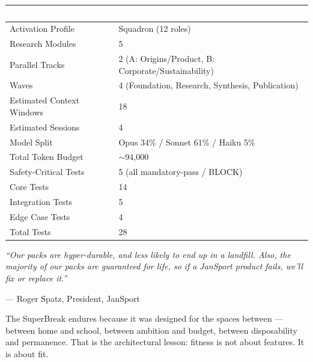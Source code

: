 \documentclass[11pt,letterpaper]{article}
\newcommand{\tableheader}[1]{\textbf{\sffamily\textcolor{white}{#1}}}
\begin{document}
\begin{center}
\begin{tabularx}{\textwidth}{L{5cm}X}
\toprule
{}
\tableheader{Metric} & \tableheader{Value} \\
\midrule
Activation Profile & Squadron (12 roles) \\
Research Modules & 5 \\
Parallel Tracks & 2 (A: Origins/Product, B: Corporate/Sustainability) \\
Waves & 4 (Foundation, Research, Synthesis, Publication) \\
Estimated Context Windows & 18 \\
Estimated Sessions & 4 \\
Model Split & Opus 34\% / Sonnet 61\% / Haiku 5\% \\
Total Token Budget & ${\sim}$94,000 \\
Safety-Critical Tests & 5 (all mandatory-pass / BLOCK) \\
Core Tests & 14 \\
Integration Tests & 5 \\
Edge Case Tests & 4 \\
Total Tests & 28 \\
\bottomrule
\end{tabularx}
\end{center}

\vspace{1cm}

\begin{quotebox}
\textit{``Our packs are hyper-durable, and less likely to end up in a landfill. Also, the majority of our packs are guaranteed for life, so if a JanSport product fails, we'll fix or replace it.''}

\vspace{0.3em}

\hfill --- Roger Spatz, President, JanSport

\vspace{0.8em}

The SuperBreak endures because it was designed for the spaces between --- between home and school, between ambition and budget, between disposability and permanence. That is the architectural lesson: fitness is not about features. It is about fit.
\end{quotebox}
\end{document}
